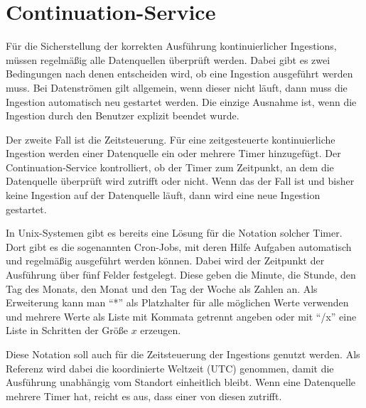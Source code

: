 \section{Continuation-Service}

Für die Sicherstellung der korrekten Ausführung kontinuierlicher Ingestions, müssen regelmäßig alle Datenquellen überprüft werden.
Dabei gibt es zwei Bedingungen nach denen entscheiden wird, ob eine Ingestion ausgeführt werden muss.
Bei Datenströmen gilt allgemein, wenn dieser nicht läuft, dann muss die Ingestion automatisch neu gestartet werden.
Die einzige Ausnahme ist, wenn die Ingestion durch den Benutzer explizit beendet wurde.

Der zweite Fall ist die Zeitsteuerung.
Für eine zeitgesteuerte kontinuierliche Ingestion werden einer Datenquelle ein oder mehrere Timer hinzugefügt.
Der Continuation-Service kontrolliert, ob der Timer zum Zeitpunkt, an dem die Datenquelle überprüft wird zutrifft oder nicht.
Wenn das der Fall ist und bisher keine Ingestion auf der Datenquelle läuft, dann wird eine neue Ingestion gestartet.

In Unix-Systemen gibt es bereits eine Lösung für die Notation solcher Timer.
Dort gibt es die sogenannten Cron-Jobs, mit deren Hilfe Aufgaben automatisch und regelmäßig ausgeführt werden können.
Dabei wird der Zeitpunkt der Ausführung über fünf Felder festgelegt.
Diese geben die Minute, die Stunde, den Tag des Monats, den Monat und den Tag der Woche als Zahlen an.
Als Erweiterung kann man "`*"' als Platzhalter für alle möglichen Werte verwenden und mehrere Werte als Liste mit Kommata getrennt angeben oder mit "`/x"' eine Liste in Schritten der Größe $x$ erzeugen.

Diese Notation soll auch für die Zeitsteuerung der Ingestions genutzt werden.
Als Referenz wird dabei die koordinierte Weltzeit (UTC) genommen, damit die Ausführung unabhängig vom Standort einheitlich bleibt.
Wenn eine Datenquelle mehrere Timer hat, reicht es aus, dass einer von diesen zutrifft.